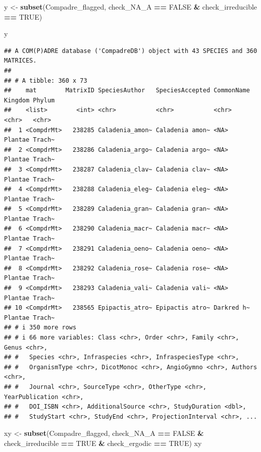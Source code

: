 \documentclass[
]{book}
\newenvironment{Shaded}{\begin{snugshade}}{\end{snugshade}}
\newcommand{\ConstantTok}[1]{\textcolor[rgb]{0.56,0.35,0.01}{#1}}
\newcommand{\FunctionTok}[1]{\textcolor[rgb]{0.13,0.29,0.53}{\textbf{#1}}}
\newcommand{\NormalTok}[1]{#1}
\newcommand{\OtherTok}[1]{\textcolor[rgb]{0.56,0.35,0.01}{#1}}
\newcommand{\SpecialCharTok}[1]{\textcolor[rgb]{0.81,0.36,0.00}{\textbf{#1}}}
\theoremstyle{definition}
\theoremstyle{definition}
\theoremstyle{definition}
\theoremstyle{definition}
\theoremstyle{remark}
\begin{document}
\begin{Shaded}
\begin{Highlighting}[]
\NormalTok{y }\OtherTok{\textless{}{-}} \FunctionTok{subset}\NormalTok{(Compadre\_flagged, check\_NA\_A }\SpecialCharTok{==} \ConstantTok{FALSE} \SpecialCharTok{\&}\NormalTok{ check\_irreducible }\SpecialCharTok{==} \ConstantTok{TRUE}\NormalTok{)}

\NormalTok{y}
\end{Highlighting}
\end{Shaded}

\begin{verbatim}
## A COM(P)ADRE database ('CompadreDB') object with 43 SPECIES and 360 MATRICES.
## 
## # A tibble: 360 x 73
##    mat        MatrixID SpeciesAuthor   SpeciesAccepted CommonName Kingdom Phylum
##    <list>        <int> <chr>           <chr>           <chr>      <chr>   <chr> 
##  1 <CompdrMt>   238285 Caladenia_amon~ Caladenia amon~ <NA>       Plantae Trach~
##  2 <CompdrMt>   238286 Caladenia_argo~ Caladenia argo~ <NA>       Plantae Trach~
##  3 <CompdrMt>   238287 Caladenia_clav~ Caladenia clav~ <NA>       Plantae Trach~
##  4 <CompdrMt>   238288 Caladenia_eleg~ Caladenia eleg~ <NA>       Plantae Trach~
##  5 <CompdrMt>   238289 Caladenia_gran~ Caladenia gran~ <NA>       Plantae Trach~
##  6 <CompdrMt>   238290 Caladenia_macr~ Caladenia macr~ <NA>       Plantae Trach~
##  7 <CompdrMt>   238291 Caladenia_oeno~ Caladenia oeno~ <NA>       Plantae Trach~
##  8 <CompdrMt>   238292 Caladenia_rose~ Caladenia rose~ <NA>       Plantae Trach~
##  9 <CompdrMt>   238293 Caladenia_vali~ Caladenia vali~ <NA>       Plantae Trach~
## 10 <CompdrMt>   238565 Epipactis_atro~ Epipactis atro~ Darkred h~ Plantae Trach~
## # i 350 more rows
## # i 66 more variables: Class <chr>, Order <chr>, Family <chr>, Genus <chr>,
## #   Species <chr>, Infraspecies <chr>, InfraspeciesType <chr>,
## #   OrganismType <chr>, DicotMonoc <chr>, AngioGymno <chr>, Authors <chr>,
## #   Journal <chr>, SourceType <chr>, OtherType <chr>, YearPublication <chr>,
## #   DOI_ISBN <chr>, AdditionalSource <chr>, StudyDuration <dbl>,
## #   StudyStart <chr>, StudyEnd <chr>, ProjectionInterval <chr>, ...
\end{verbatim}

\begin{Shaded}
\begin{Highlighting}[]
\NormalTok{xy }\OtherTok{\textless{}{-}} \FunctionTok{subset}\NormalTok{(Compadre\_flagged, check\_NA\_A }\SpecialCharTok{==} \ConstantTok{FALSE} \SpecialCharTok{\&}\NormalTok{ check\_irreducible }\SpecialCharTok{==} \ConstantTok{TRUE} \SpecialCharTok{\&}\NormalTok{ check\_ergodic }\SpecialCharTok{==} \ConstantTok{TRUE}\NormalTok{)}
\NormalTok{xy}
\end{Highlighting}
\end{Shaded}
\end{document}
